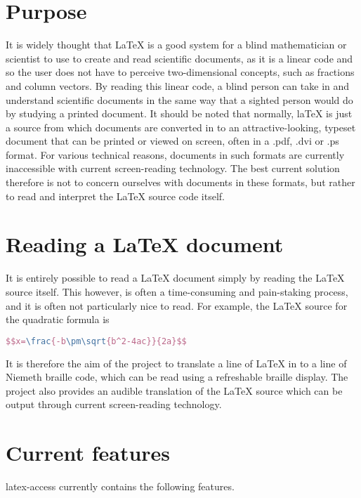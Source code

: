 \documentclass[12pt,a4paper]{report}
\begin{document}
\section{Purpose}
\label{subchap-purpose}
It is widely thought that LaTeX is a good system for a blind
mathematician or scientist to use to create and read
scientific documents, as it is a linear code and so the user does
not have to perceive two-dimensional concepts, such
as fractions and column vectors.
By reading this linear code, a blind person can take in and
understand scientific documents in the same way that a
sighted person would do by studying a printed document.
It should be noted that normally, laTeX is just a source from which
documents are converted in to an
attractive-looking, typeset document that can be printed or viewed
on screen, often in a .pdf, .dvi or .ps format. For
various technical reasons, documents in such formats are
currently inaccessible with current screen-reading technology.
The best current solution therefore is not to concern
ourselves with documents in these formats, but rather to
read
and interpret the LaTeX source code itself.

\section{Reading a LaTeX document}
\label{subchap-reading-latex-document}

It is entirely possible to read a LaTeX document simply by reading
the LaTeX source itself. This however, is often a
time-consuming and pain-staking process, and it is often not
particularly nice to read. For example, the LaTeX source
for the quadratic formula is\\
\begin{lstlisting}[language = tex]
$$x=\frac{-b\pm\sqrt{b^2-4ac}}{2a}$$
\end{lstlisting}

It is therefore the aim of the project to translate a
line of LaTeX in to a line of Niemeth braille code, which
can be
read using a refreshable braille display. The project
also provides an audible translation of the
LaTeX source
which can be output through current screen-reading
technology.          

\section{Current features}
\label{subchap-current-features}

latex-access currently contains the following features.
\end{document}
